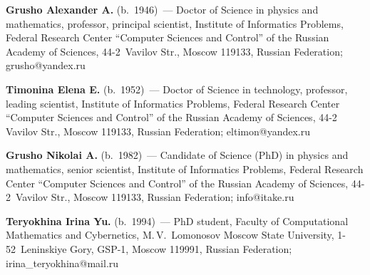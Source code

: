 \noindent
\textbf{Grusho Alexander A.} (b.\ 1946)~--- Doctor of Science in physics and mathematics, professor, 
principal scientist, Institute of Informatics Problems, Federal Research Center ``Computer Sciences 
and Control'' of the Russian Academy of Sciences, 44-2~Vavilov Str., Moscow 119133, Russian 
Federation;  \mbox{grusho@yandex.ru}

\vspace*{3pt}

\noindent
\textbf{Timonina Elena E.} (b.\ 1952)~--- Doctor of Science in technology, professor, leading scientist, 
Institute of Informatics Problems, Federal Research Center ``Computer Sciences and Control'' of the 
Russian Academy of Sciences, 44-2 Vavilov Str., Moscow 119133, Russian Federation; 
\mbox{eltimon@yandex.ru}

\vspace*{3pt}

\noindent
\textbf{Grusho Nikolai A.} (b.\ 1982)~--- Candidate of Science (PhD) in physics and mathematics, 
senior scientist, Institute of Informatics Problems, Federal Research Center ``Computer Sciences and 
Control'' of the Russian Academy of Sciences, 44-2~Vavilov Str., Moscow 119133, Russian 
Federation; \mbox{info@itake.ru}

\vspace*{3pt}

\noindent
\textbf{Teryokhina Irina Yu.} (b.\ 1994)~--- PhD student, Faculty of Computational Mathematics and 
Cybernetics, M.\,V.~Lomonosov Moscow State University, 1-52~Leninskiye Gory, GSP-1, Moscow 
119991, Russian Federation; \mbox{irina\_teryokhina@mail.ru}
\label{end\stat}

\renewcommand{\bibname}{\protect\rm Литература} 